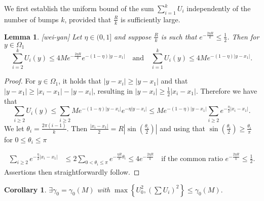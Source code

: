 \documentclass[a4paper,11pt]{article}
\def\blue{\color{blue}}
\def\blue{\color{blue}}
\newtheorem{lemma}{Lemma}[section]
\newtheorem{corollary}{Corollary}[section]
\numberwithin{step}{dummy}
\begin{document}
We first establish the uniform bound of the sum $\displaystyle \sum_{i=1}^k U_i$ independently of the number of bumps $k$, provided that $\frac{R}{k}$ is sufficiently large. 
\begin{lemma}\label{ksum}[{\blue wei-yan}] Let $\eta \in (0,1]$ and suppose $\frac{R}{k}$ is such that $e^{-\frac{2\eta R}{k}} \le \frac{1}{2}$. Then for $y \in{\Omega}_1$
$$\displaystyle \sum_{i=2}^k U_i(y) \le 4Me^{-\frac{2\eta R}{k}} e^{-(1-\eta)|y-x_1|} \quad\text{and} \quad \displaystyle \sum_{i=1}^k U_i(y) \le 4Me^{-(1-\eta)|y-x_1|}.$$
 \end{lemma}
\begin{proof}

For $y\in \Omega_1$, it holds that $|y-x_i|\ge |y-x_1|$ and that $|y-x_1| \ge |x_i-x_1|-|y-x_i|$, resulting in $|y-x_i|\ge \frac{1}{2}|x_i-x_1|$. Therefore we have that
$$\sum_{i\ge 2} U_i(y) \le \sum_{i\ge 2} Me^{-(1-\eta)|y-x_i|} e^{-\eta|y-x_i|}
\le Me^{-(1-\eta)|y-x_1|}\sum_{i\ge 2} e^{-\frac{\eta}{2}|x_i-x_1|} .$$
We let $\theta_i = \frac{2\pi(i-1)}{k}$. Then $ \frac{|x_i-x_1|}{2} = R\left|\sin\left(\frac{\theta_i}{2}\right)\right|$ and using that $ \sin\left(\frac{\theta_i}{2}\right) \ge \frac{\theta_i}{\pi}$ for $0\le\theta_i \le \pi$

\begin{align*}
 \sum_{i\ge 2} e^{-\frac{\eta}{2}|x_i-x_1|} &\le 2\sum_{0<\theta_i \le \pi} e^{-\frac{\eta R}{\pi}\theta_i} \le 4 e^{-\frac{2\eta R}{k}} \quad \text{if the common ratio $e^{-\frac{2\eta R}{k}} \le \frac{1}{2}$}.
\end{align*}
Assertions then straightforwardly follow.
 \end{proof}

\begin{corollary}
 $\exists \gamma_0 = \gamma_0(M)$ with $\displaystyle \max\left\{U_0^2 , \left(\sum U_i\right)^2\right\} \le \gamma_0(M).$

\end{corollary}
\end{document}
